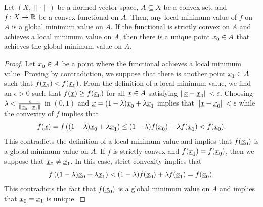 \begin{theorem}
\label{theorem:convex_unique_min}
Let $(X,\|\cdot\|)$ be a normed vector space, $A \subseteq X$ be a convex set, and $f \colon X \rightarrow \mathbb{R}$ be a convex functional on $A$.
Then, any local minimum value of $f$ on $A$ is a global minimum value on $A$.
If the functional is strictly convex on $A$ and achieves a local minimum value on $A$, then there is a unique point $\underline{x}_0 \in A$ that achieves the global minimum value on $A$.
\end{theorem}
\begin{proof}
Let $\underline{x}_0 \in A$ be a point where the functional achieves a local minimum value.
Proving by contradiction, we suppose that there is another point $\underline{x}_1 \in A$ such that $f(\underline{x}_1) <f(\underline{x}_0)$.
From the definition of a local minimum value, we find an $\epsilon > 0$ such that $f(\underline{x}) \geq f(\underline{x}_0)$ for all $\underline{x} \in A$ satisfying $\| \underline{x} - \underline{x}_0 \| < \epsilon$.
Choosing $\lambda < \frac{\epsilon}{\smash{\| \underline{x}_0 - \underline{x}_1 \|}}$ in $(0,1)$ and $\underline{x} = (1-\lambda) \underline{x}_0 + \lambda \underline{x}_1$ implies that $\| \underline{x} - \underline{x}_0 \| < \epsilon $
while the convexity of $f$ implies that
\[ f( \underline{x} ) = f \left( (1-\lambda) \underline{x}_0 + \lambda \underline{x}_1 \right) \leq (1-\lambda) f(\underline{x}_0) + \lambda f(\underline{x}_1) < f(\underline{x}_0). \]
This contradicts the definition of a local minimum value and implies that $f(\underline{x}_0)$ is a global minimum value on $A$.
If $f$ is strictly convex and $f(\underline{x}_1) = f(\underline{x}_0)$, then we suppose that $\underline{x}_0 \neq \underline{x}_1$.
In this case, strict convexity implies that
\[ f \left( (1-\lambda) \underline{x}_0 + \lambda \underline{x}_1 \right) < (1-\lambda) f(\underline{x}_0) + \lambda f(\underline{x}_1) = f(\underline{x}_0). \]
This contradicts the fact that $f(\underline{x}_0)$ is a global minimum value on $A$ and implies that $\underline{x}_0 = \underline{x}_1$ is unique.
\end{proof}

